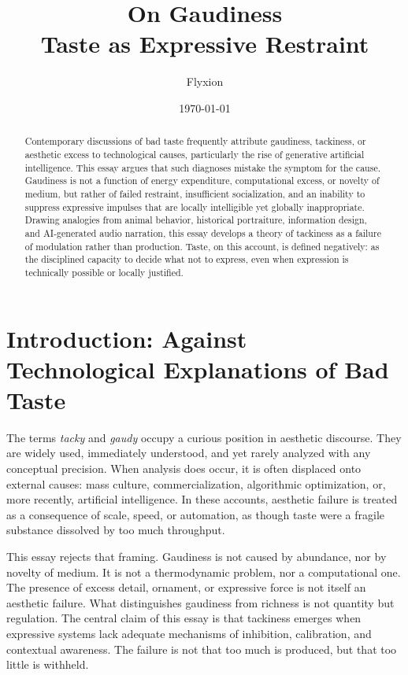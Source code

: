 \documentclass[12pt]{article}
\title{\textbf{On Gaudiness}\\
\large Taste as Expressive Restraint}
\author{Flyxion}
\date{\today }
\begin{document}
\maketitle

\begin{abstract}
Contemporary discussions of bad taste frequently attribute gaudiness, tackiness, or aesthetic excess to technological causes, particularly the rise of generative artificial intelligence. This essay argues that such diagnoses mistake the symptom for the cause. Gaudiness is not a function of energy expenditure, computational excess, or novelty of medium, but rather of failed restraint, insufficient socialization, and an inability to suppress expressive impulses that are locally intelligible yet globally inappropriate. Drawing analogies from animal behavior, historical portraiture, information design, and AI-generated audio narration, this essay develops a theory of tackiness as a failure of modulation rather than production. Taste, on this account, is defined negatively: as the disciplined capacity to decide what not to express, even when expression is technically possible or locally justified.
\end{abstract}

\newpage
\section{Introduction: Against Technological Explanations of Bad Taste}

The terms \emph{tacky} and \emph{gaudy} occupy a curious position in aesthetic discourse. They are widely used, immediately understood, and yet rarely analyzed with any conceptual precision. When analysis does occur, it is often displaced onto external causes: mass culture, commercialization, algorithmic optimization, or, more recently, artificial intelligence. In these accounts, aesthetic failure is treated as a consequence of scale, speed, or automation, as though taste were a fragile substance dissolved by too much throughput.

This essay rejects that framing. Gaudiness is not caused by abundance, nor by novelty of medium. It is not a thermodynamic problem, nor a computational one. The presence of excess detail, ornament, or expressive force is not itself an aesthetic failure. What distinguishes gaudiness from richness is not quantity but regulation. The central claim of this essay is that tackiness emerges when expressive systems lack adequate mechanisms of inhibition, calibration, and contextual awareness. The failure is not that too much is produced, but that too little is withheld.
\end{document}
